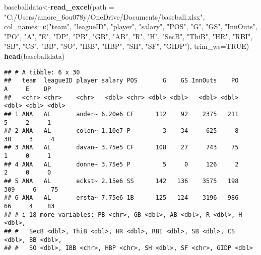 \documentclass[
]{article}
\author{}
\date{\vspace{-2.5em}}
\newenvironment{Shaded}{\begin{snugshade}}{\end{snugshade}}
\newcommand{\AttributeTok}[1]{\textcolor[rgb]{0.13,0.29,0.53}{#1}}
\newcommand{\ConstantTok}[1]{\textcolor[rgb]{0.56,0.35,0.01}{#1}}
\newcommand{\FunctionTok}[1]{\textcolor[rgb]{0.13,0.29,0.53}{\textbf{#1}}}
\newcommand{\NormalTok}[1]{#1}
\newcommand{\OtherTok}[1]{\textcolor[rgb]{0.56,0.35,0.01}{#1}}
\newcommand{\StringTok}[1]{\textcolor[rgb]{0.31,0.60,0.02}{#1}}
\begin{document}
\begin{Shaded}
\begin{Highlighting}[]
\NormalTok{baseballdata}\OtherTok{\textless{}{-}}\FunctionTok{read\_excel}\NormalTok{(}\AttributeTok{path =} \StringTok{"C:/Users/amore\_6ou078y/OneDrive/Documents/baseball.xlsx"}\NormalTok{, }
                         \AttributeTok{col\_names=}\FunctionTok{c}\NormalTok{(}\StringTok{"team"}\NormalTok{, }\StringTok{"leagueID"}\NormalTok{, }\StringTok{"player"}\NormalTok{, }\StringTok{"salary"}\NormalTok{, }\StringTok{"POS"}\NormalTok{, }\StringTok{"G"}\NormalTok{, }\StringTok{"GS"}\NormalTok{, }\StringTok{"InnOuts"}\NormalTok{, }\StringTok{"PO"}\NormalTok{, }\StringTok{"A"}\NormalTok{, }\StringTok{"E"}\NormalTok{, }\StringTok{"DP"}\NormalTok{, }\StringTok{"PB"}\NormalTok{, }\StringTok{"GB"}\NormalTok{, }\StringTok{"AB"}\NormalTok{, }\StringTok{"R"}\NormalTok{, }\StringTok{"H"}\NormalTok{, }\StringTok{"SecB"}\NormalTok{, }\StringTok{"ThiB"}\NormalTok{, }\StringTok{"HR"}\NormalTok{, }\StringTok{"RBI"}\NormalTok{, }\StringTok{"SB"}\NormalTok{, }\StringTok{"CS"}\NormalTok{, }\StringTok{"BB"}\NormalTok{, }\StringTok{"SO"}\NormalTok{, }\StringTok{"IBB"}\NormalTok{, }\StringTok{"HBP"}\NormalTok{, }\StringTok{"SH"}\NormalTok{, }\StringTok{"SF"}\NormalTok{, }\StringTok{"GIDP"}\NormalTok{), }
                         \AttributeTok{trim\_ws=}\ConstantTok{TRUE}\NormalTok{)}
\FunctionTok{head}\NormalTok{(baseballdata)}
\end{Highlighting}
\end{Shaded}

\begin{verbatim}
## # A tibble: 6 x 30
##   team  leagueID player salary POS       G    GS InnOuts    PO     A     E    DP
##   <chr> <chr>    <chr>   <dbl> <chr> <dbl> <dbl>   <dbl> <dbl> <dbl> <dbl> <dbl>
## 1 ANA   AL       ander~ 6.20e6 CF      112    92    2375   211     5     2     1
## 2 ANA   AL       colon~ 1.10e7 P         3    34     625     8    30     3     4
## 3 ANA   AL       davan~ 3.75e5 CF      108    27     743    75     1     0     1
## 4 ANA   AL       donne~ 3.75e5 P         5     0     126     2     2     0     0
## 5 ANA   AL       eckst~ 2.15e6 SS      142   136    3575   198   309     6    75
## 6 ANA   AL       ersta~ 7.75e6 1B      125   124    3196   986    66     4    83
## # i 18 more variables: PB <chr>, GB <dbl>, AB <dbl>, R <dbl>, H <dbl>,
## #   SecB <dbl>, ThiB <dbl>, HR <dbl>, RBI <dbl>, SB <dbl>, CS <dbl>, BB <dbl>,
## #   SO <dbl>, IBB <chr>, HBP <chr>, SH <dbl>, SF <chr>, GIDP <dbl>
\end{verbatim}
\end{document}
